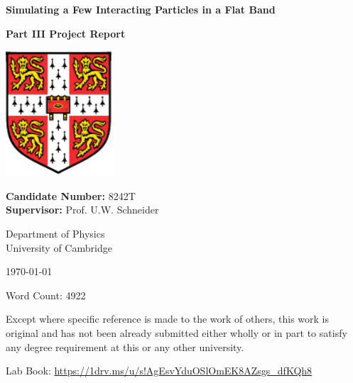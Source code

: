 \begin{titlepage}
   \begin{center}
        \text{ }\vspace{0.5cm}
        \textbf{\huge Simulating a Few Interacting Particles in a Flat Band}
        
        
        
        \vspace{1cm}
        
        \textbf{\Large Part III Project Report}
        
        \vspace{1cm}
        
        \includegraphics[width=4cm]{Figures/University_Crest.pdf}
        
        \vspace{0.5cm}
        
        \large
        \textbf{Candidate Number:} 8242T\\
        \textbf{Supervisor:} Prof. U.W. Schneider
        
        \vspace{0.5cm}
        
        Department of  Physics\\
        University of Cambridge \\
        
        \vspace{0.5cm}
        
        \today
        
        \vspace{0.5cm}
        
        Word Count: 4922

        \vspace{0.5cm}
        \normalsize
        Except where specific reference is made to the work of others, this work is original and has not been already submitted either wholly or in part to satisfy any degree requirement at this or any other university.

        \vspace{0.5cm}

        Lab Book: \url{https://1drv.ms/u/s!AgEsvYduOSlOmEK8AZsgs_dfKQh8}
   \end{center}
\end{titlepage}